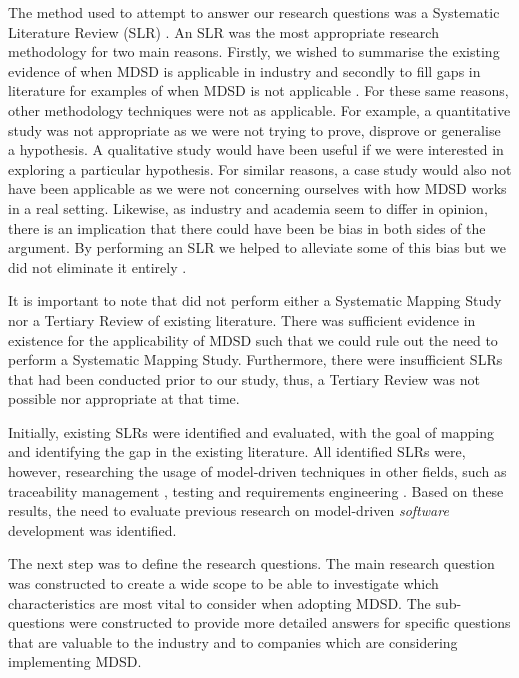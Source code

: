 \documentclass[10pt,twocolumn]{article}
\begin{document}
The method used to attempt to answer our research questions was a Systematic Literature Review (SLR) \cite{kitchenham2007guidelines}. An SLR was the most appropriate research methodology for two main reasons. Firstly, we wished to summarise the existing evidence of when MDSD is applicable in industry and secondly to fill gaps in literature for examples of when MDSD is not applicable \cite{kitchenham2007guidelines}. For these same reasons, other methodology techniques were not as applicable. For example, a quantitative study was not appropriate as we were not trying to prove, disprove or generalise a hypothesis. A qualitative study would have been useful if we were interested in exploring a particular hypothesis. For similar reasons, a case study would also not have been applicable as we were not concerning ourselves with how MDSD works in a real setting. Likewise, as industry and academia seem to differ in opinion, there is an implication that there could have been be bias in both sides of the argument. By performing an SLR we helped to alleviate some of this bias but we did not eliminate it entirely \cite{kitchenham2007guidelines}.

It is important to note that did not perform either a Systematic Mapping Study nor a Tertiary Review of \cite{kitchenham2007guidelines} existing literature. There was sufficient evidence in existence for the applicability of MDSD such that we could rule out the need to perform a Systematic Mapping Study. Furthermore, there were insufficient SLRs that had been conducted prior to our study, thus, a Tertiary Review \cite{kitchenham2007guidelines} was not possible nor appropriate at that time.


Initially, existing SLRs were identified and evaluated, with the goal of mapping and identifying the gap in the existing literature. All identified SLRs \cite{santiago2012model} \cite{dias2007survey} \cite{loniewski2010systematic} \cite{nicolas2009generation} were, however, researching the usage of model-driven techniques in other fields, such as traceability management \cite{santiago2012model}, testing \cite{dias2007survey} and requirements engineering \cite{loniewski2010systematic} \cite{nicolas2009generation}. Based on these results, the need to evaluate previous research on model-driven \textit{software} development was identified. 

The next step was to define the research questions. The main research question was constructed to create a wide scope to be able to investigate which characteristics are most vital to consider when adopting MDSD. The sub-questions were constructed to provide more detailed answers for specific questions that are valuable to the industry and to companies which are considering implementing MDSD. 
\end{document}
